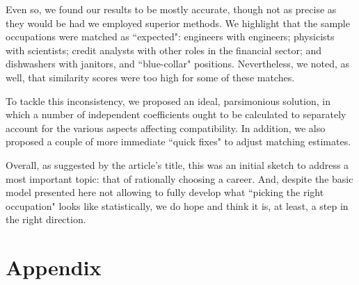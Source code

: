 \documentclass{article}
\begin{document}
Even so, we found our results to be mostly accurate, though not as precise as
they would be had we employed superior methods. We highlight that the sample
occupations were matched as ``expected": engineers with engineers; physicists
with scientists; credit analysts with other roles in the financial sector; and
dishwashers with janitors, and ``blue-collar" positions. Nevertheless, we
noted, as well, that similarity scores were too high for some of these matches.

To tackle this inconsistency, we proposed an ideal, parsimonious solution, in
which a number of independent coefficients ought to be calculated to separately
account for the various aspects affecting compatibility. In addition, we also
proposed a couple of more immediate ``quick fixes" to adjust matching
estimates.

Overall, as suggested by the article's title, this was an initial sketch to
address a most important topic: that of rationally choosing a career. And,
despite the basic model presented here not allowing to fully develop what
``picking the right occupation" looks like statistically, we do hope and think
it is, at least, a step in the right direction.

\newpage
\printbibliography[
    heading=bibintoc,
    title={References}
]

\newpage
\section*{Appendix}
\DetailedSkillSets
\end{document}
